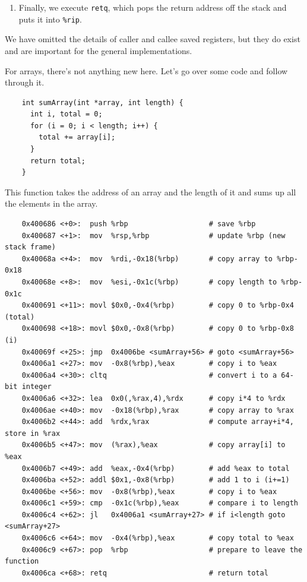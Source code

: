 \begin{example}
\begin{enumerate}
      \item Finally, we execute \texttt{retq}, which pops the return address off the stack and puts it into \texttt{\%rip}. 
    \end{enumerate}
  \end{example}

  We have omitted the details of caller and callee saved registers, but they do exist and are important for the general implementations. 

  For arrays, there's not anything new here. Let's go over some code and follow through it. 

  \begin{lstlisting}
    int sumArray(int *array, int length) {
      int i, total = 0;
      for (i = 0; i < length; i++) {
        total += array[i];
      }
      return total;
    }
  \end{lstlisting}

  This function takes the address of an array and the length of it and sums up all the elements in the array. 

  \begin{lstlisting}
    0x400686 <+0>:	push %rbp                   # save %rbp
    0x400687 <+1>:	mov  %rsp,%rbp              # update %rbp (new stack frame)
    0x40068a <+4>:	mov  %rdi,-0x18(%rbp)       # copy array to %rbp-0x18
    0x40068e <+8>:	mov  %esi,-0x1c(%rbp)       # copy length to %rbp-0x1c
    0x400691 <+11>:	movl $0x0,-0x4(%rbp)        # copy 0 to %rbp-0x4 (total)
    0x400698 <+18>:	movl $0x0,-0x8(%rbp)        # copy 0 to %rbp-0x8 (i)
    0x40069f <+25>:	jmp  0x4006be <sumArray+56> # goto <sumArray+56>
    0x4006a1 <+27>:	mov  -0x8(%rbp),%eax        # copy i to %eax
    0x4006a4 <+30>:	cltq                        # convert i to a 64-bit integer
    0x4006a6 <+32>:	lea  0x0(,%rax,4),%rdx      # copy i*4 to %rdx
    0x4006ae <+40>:	mov  -0x18(%rbp),%rax       # copy array to %rax
    0x4006b2 <+44>:	add  %rdx,%rax              # compute array+i*4, store in %rax
    0x4006b5 <+47>:	mov  (%rax),%eax            # copy array[i] to %eax
    0x4006b7 <+49>:	add  %eax,-0x4(%rbp)        # add %eax to total
    0x4006ba <+52>:	addl $0x1,-0x8(%rbp)        # add 1 to i (i+=1)
    0x4006be <+56>:	mov  -0x8(%rbp),%eax        # copy i to %eax
    0x4006c1 <+59>:	cmp  -0x1c(%rbp),%eax       # compare i to length
    0x4006c4 <+62>:	jl   0x4006a1 <sumArray+27> # if i<length goto <sumArray+27>
    0x4006c6 <+64>:	mov  -0x4(%rbp),%eax        # copy total to %eax
    0x4006c9 <+67>:	pop  %rbp                   # prepare to leave the function
    0x4006ca <+68>:	retq                        # return total
  \end{lstlisting}

